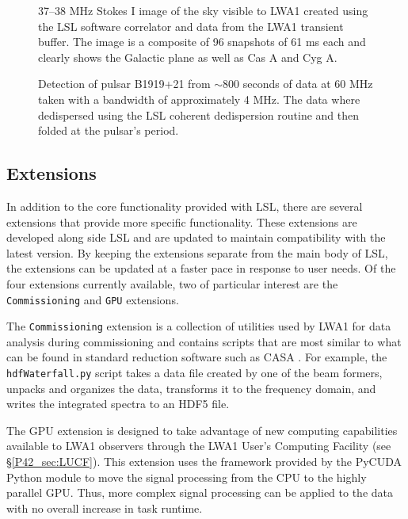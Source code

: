 \begin{figure}
	\caption{\label{P42_fig:sky}37--38 MHz Stokes I image of the sky visible to LWA1 created using the LSL software correlator and data from the LWA1 transient buffer.  The image is a composite of 96 snapshots of 61 ms each and clearly shows the Galactic plane as well as Cas A and Cyg A.}
\end{figure}

\begin{figure}
	\caption{\label{P42_fig:psr}Detection of pulsar B1919+21 from $\sim$800 seconds of data at 60 MHz taken with a bandwidth of approximately 4 MHz.  The data where dedispersed using the LSL coherent dedispersion routine and then folded at the pulsar's period.}
\end{figure}

\subsection{Extensions}
In addition to the core functionality provided with LSL, there are several extensions that provide more specific functionality.  These extensions are developed along side LSL and  are updated to maintain compatibility with the latest version.  By keeping the extensions separate from the main body of LSL, the extensions can be updated at a faster pace in response to user needs.  Of the four extensions currently available, two of particular interest are the {\tt Commissioning} and {\tt GPU} extensions.

The {\tt Commissioning} extension is a collection of utilities used by LWA1 for data analysis during commissioning and contains scripts that are most similar to what can be found in standard reduction software such as CASA .  For example, the {\tt hdfWaterfall.py} script takes a data file created by one of the beam formers, unpacks and organizes the data, transforms it to the frequency domain, and writes the integrated spectra to an HDF5 file.  

 The GPU extension is designed to take advantage of new computing capabilities available to LWA1 observers through the LWA1 User's Computing Facility (see \S\ref{P42_sec:LUCF}).  This extension uses the framework provided by the PyCUDA \citep{PyCUDA} Python module to move the signal processing from the CPU to the highly parallel GPU.  Thus, more complex signal processing can be applied to the data with no overall increase in task runtime.

